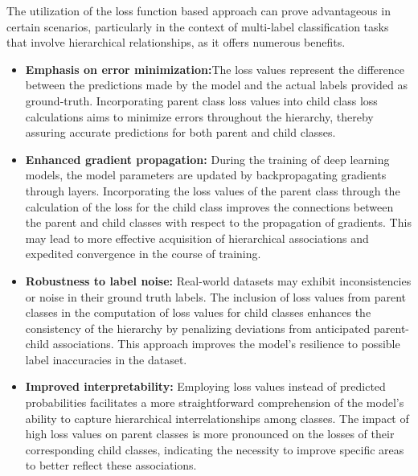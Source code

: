 The utilization of the loss function based approach can prove advantageous in certain scenarios, particularly in the context of multi-label classification tasks that involve hierarchical relationships, as it offers numerous benefits.
\begin{itemize}
    \item \textbf{Emphasis on error minimization:}The loss values represent the difference between the predictions made by the model and the actual labels provided as ground-truth. Incorporating parent class loss values into child class loss calculations aims to minimize errors throughout the hierarchy, thereby assuring accurate predictions for both parent and child classes.
    \item \textbf{Enhanced gradient propagation:} During the training of deep learning models, the model parameters are updated by backpropagating gradients through layers. Incorporating the loss values of the parent class through the calculation of the loss for the child class improves the connections between the parent and child classes with respect to the propagation of gradients. This may lead to more effective acquisition of hierarchical associations and expedited convergence in the course of training.
    \item \textbf{Robustness to label noise:} Real-world datasets may exhibit inconsistencies or noise in their ground truth labels. The inclusion of loss values from parent classes in the computation of loss values for child classes enhances the consistency of the hierarchy by penalizing deviations from anticipated parent-child associations. This approach improves the model's resilience to possible label inaccuracies in the dataset.
    \item \textbf{Improved interpretability:} Employing loss values instead of predicted probabilities facilitates a more straightforward comprehension of the model's ability to capture hierarchical interrelationships among classes. The impact of high loss values on parent classes is more pronounced on the losses of their corresponding child classes, indicating the necessity to improve specific areas to better reflect these associations.
\end{itemize}

